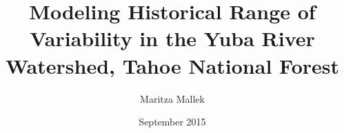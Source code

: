 \documentclass[12pt]{book}
\begin{document}
\author{Maritza Mallek}
\title{Modeling Historical Range of Variability in the Yuba River Watershed, Tahoe National Forest}
\date{September 2015}

%

\maketitle
\frontmatter 
\tableofcontents 
%

\mainmatter 

 
 
 
%
 

%
%
%
%
%
%

\backmatter 
% 
% 
\end{document}
